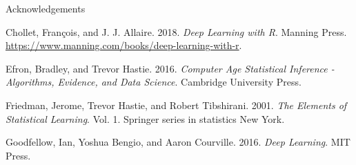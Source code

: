 \documentclass[10pt,ignorenonframetext,]{beamer}
\begin{document}
\begin{frame}{Acknowledgements}
\protect\hypertarget{acknowledgements-1}{}

\hypertarget{refs}{}
\leavevmode\hypertarget{ref-kerasR}{}%
Chollet, François, and J. J. Allaire. 2018. \emph{Deep Learning with R}.
Manning Press. \url{https://www.manning.com/books/deep-learning-with-r}.

\leavevmode\hypertarget{ref-casi}{}%
Efron, Bradley, and Trevor Hastie. 2016. \emph{Computer Age Statistical
Inference - Algorithms, Evidence, and Data Science}. Cambridge
University Press.

\leavevmode\hypertarget{ref-ESL}{}%
Friedman, Jerome, Trevor Hastie, and Robert Tibshirani. 2001. \emph{The
Elements of Statistical Learning}. Vol. 1. Springer series in statistics
New York.

\leavevmode\hypertarget{ref-goodfellow}{}%
Goodfellow, Ian, Yoshua Bengio, and Aaron Courville. 2016. \emph{Deep
Learning}. MIT Press.

\end{frame}
\end{document}
